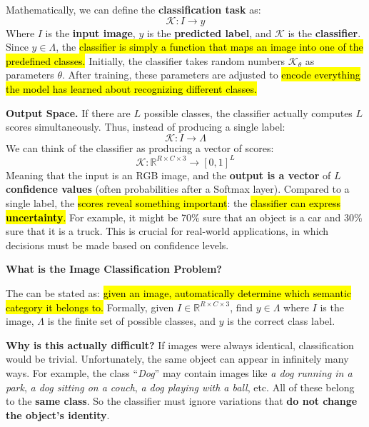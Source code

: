 \highspace
Mathematically, we can define the \textbf{classification task} as:
\begin{equation*}
    \mathcal{K}: I \to y
\end{equation*}
Where $I$ is the \textbf{input image}, $y$ is the \textbf{predicted label}, and $\mathcal{K}$ is the \textbf{classifier}. Since $y \in \Lambda$, the \hl{classifier is simply a function that maps an image into one of the predefined classes.} Initially, the classifier takes random numbers $\mathcal{K}_{\theta}$ as parameters $\theta$. After training, these parameters are adjusted to \hl{encode everything the model has learned about recognizing different classes.}

\highspace
\textcolor{Green3}{ \textbf{Output Space.}} If there are $L$ possible classes, the classifier actually computes $L$ scores simultaneously. Thus, instead of producing a single label:
\begin{equation*}
    \mathcal{K}: I \to \Lambda
\end{equation*}
We can think of the classifier as producing a vector of scores:
\begin{equation*}
    \mathcal{K}: \mathbb{R}^{R \times C \times 3} \to \left[0,1\right]^{L}
\end{equation*}
Meaning that the input is an RGB image, and the \textbf{output is a vector} of $L$ \textbf{confidence values} (often probabilities after a Softmax layer). Compared to a single label, the \hl{scores reveal something important}: the \hl{classifier can express \textbf{uncertainty}.} For example, it might be 70\% sure that an object is a car and 30\% sure that it is a truck. This is crucial for real-world applications, in which decisions must be made based on confidence levels.

\highspace
\begin{flushleft}
    \textcolor{Red2}{ \textbf{What is the Image Classification Problem?}}
\end{flushleft}
The  can be stated as: \hl{given an image, automatically determine which semantic category it belongs to.} Formally, given $I \in \mathbb{R}^{R \times C \times 3}$, find $y \in \Lambda$ where $I$ is the image, $\Lambda$ is the finite set of possible classes, and $y$ is the correct class label.

\highspace
\textcolor{Red2}{ \textbf{Why is this actually difficult?}} If images were always identical, classification would be trivial. Unfortunately, the same object can appear in infinitely many ways. For example, the class ``\emph{Dog}'' may contain images like \emph{a dog running in a park}, \emph{a dog sitting on a couch}, \emph{a dog playing with a ball}, etc. All of these belong to the \textbf{same class}. So the classifier must ignore variations that \textbf{do not change the object's identity}.

